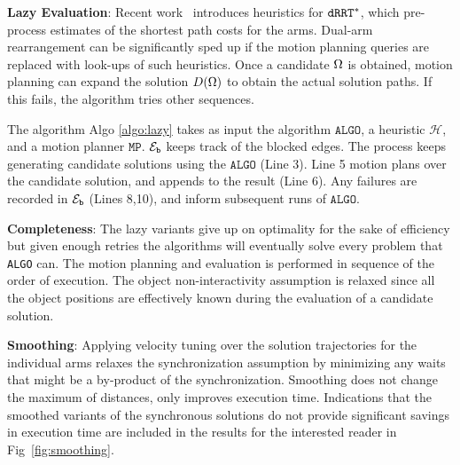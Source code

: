 
\noindent\textbf{Lazy Evaluation}: Recent work~\cite{shome2017improving} introduces heuristics for $ {\tt dRRT^*} $, which pre-process estimates of the shortest path costs for the arms. Dual-arm rearrangement can be significantly sped up if the motion planning queries are replaced with look-ups of such heuristics. Once a candidate $ {{\Omega}} $ is obtained, motion planning can expand the solution $ {D}({{\Omega}}) $ to obtain the actual solution paths. If this fails, the algorithm tries other sequences. 


The algorithm Algo \ref{algo:lazy} takes as input the algorithm $ \mathtt{ALGO} $, a heuristic $ \mathcal{H} $, and a motion planner $ \mathtt{MP} $. $ \mathcal{E}_{\mathtt{b}}$ keeps track of the blocked edges. The process keeps generating candidate solutions using the $ \mathtt{ALGO} $ (Line 3). Line 5 motion plans over the candidate solution, and appends to the result (Line 6). Any failures are recorded in  $ \mathcal{E}_{\mathtt{b}}$ (Lines 8,10), and inform subsequent runs of $ \mathtt{ALGO} $.


\noindent\textbf{Completeness}: 
The lazy variants give up on optimality for the sake of efficiency but given enough retries the algorithms will eventually solve every problem that {\tt ALGO} can. The motion planning and evaluation is performed in sequence of the order of execution. The object non-interactivity assumption is relaxed since all the object positions are effectively known during the evaluation of a candidate solution.

\noindent\textbf{Smoothing}: 
Applying velocity tuning over the solution trajectories for the individual arms relaxes the synchronization assumption
by minimizing any waits that might be a by-product of the synchronization. 
Smoothing does not change the maximum of distances, only improves execution time. Indications that the smoothed variants of the synchronous solutions do not provide significant savings in execution time are included in the results for the interested reader in Fig~\ref{fig:smoothing}.

